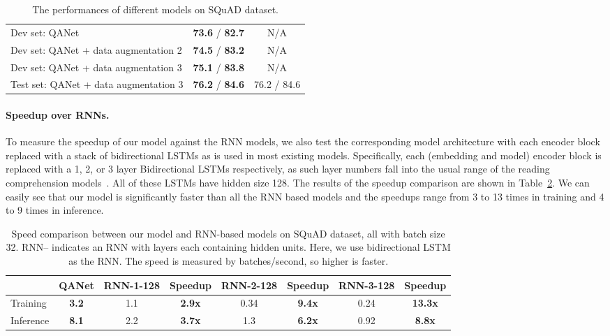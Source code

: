 \documentclass{article} \usepackage{iclr2018_conference,times}
\begin{document}
\begin{table}[ht]
\begin{center}
\begin{tabular}{lcc}
\hline
Dev set: QANet &  \textbf{73.6} / \textbf{82.7} & N/A\\
Dev set: QANet + data augmentation 2 & \textbf{74.5} / \textbf{83.2} & N/A\\
Dev set: QANet + data augmentation 3 &  \textbf{75.1} / \textbf{83.8}& N/A\\\hline
Test set: QANet + data augmentation 3 &  \textbf{76.2} / \textbf{84.6 }& 76.2 / 84.6\\
\hline \end{tabular}
\end{center}
\caption{The performances of different models on SQuAD dataset. 
}
\label{table:squad_all}
\end{table}


\paragraph{Speedup over RNNs.}
To measure the speedup of our model against the RNN models, we also test the corresponding model architecture with each encoder block replaced with a stack of bidirectional LSTMs as is used in most existing models.  Specifically, each (embedding and model) encoder block is replaced with a 1, 2, or 3 layer Bidirectional LSTMs respectively, as such layer numbers fall into the usual range of the reading comprehension models~\citep{ChenFWB17}. All of these LSTMs have hidden size 128. The results of the speedup comparison are shown in Table~\ref{table:squad_speedup}. We can easily see that our model is significantly faster than all the RNN based models and the speedups range from 3 to 13 times in training and 4 to 9 times in inference. 




\begin{table}[h!]
\small
\begin{center}
\begin{tabular}{l|c|cc|cc|cc}
\hline &QANet & RNN-1-128 & Speedup & RNN-2-128 & Speedup & RNN-3-128 & Speedup \\\hline
Training& \textbf{3.2} & 1.1 & \textbf{2.9x}  & 0.34 & \textbf{9.4x} & 0.24& \textbf{13.3x}\\
Inference& \textbf{8.1} & 2.2 & \textbf{3.7x}  & 1.3 & \textbf{6.2x} & 0.92 & \textbf{8.8x} 
\\\hline \end{tabular}
\end{center}
\caption{Speed comparison between our model and RNN-based models on SQuAD dataset, all with batch size 32. RNN-- indicates an RNN with  layers each containing  hidden units. Here, we use bidirectional LSTM as the RNN. The speed is measured by batches/second, so higher is faster.}
\label{table:squad_speedup}
\end{table}
\end{document}
